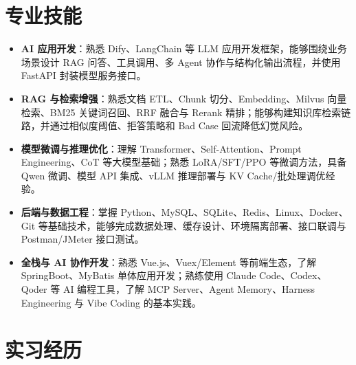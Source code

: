 \documentclass[10pt]{article}
\newlength{\iconwidth}
\begin{document}

    \section[专业技能]{\makebox[\iconwidth][c]{\color{primarycolor}{\faWrench}}\quad 专业技能}
    \begin{itemize}
        \item \textbf{AI 应用开发}：熟悉 Dify、LangChain 等 LLM 应用开发框架，能够围绕业务场景设计 RAG 问答、工具调用、多 Agent 协作与结构化输出流程，并使用 FastAPI 封装模型服务接口。
        \item \textbf{RAG 与检索增强}：熟悉文档 ETL、Chunk 切分、Embedding、Milvus 向量检索、BM25 关键词召回、RRF 融合与 Rerank 精排；能够构建知识库检索链路，并通过相似度阈值、拒答策略和 Bad Case 回流降低幻觉风险。
        \item \textbf{模型微调与推理优化}：理解 Transformer、Self-Attention、Prompt Engineering、CoT 等大模型基础；熟悉 LoRA/SFT/PPO 等微调方法，具备 Qwen 微调、模型 API 集成、vLLM 推理部署与 KV Cache/批处理调优经验。
        \item \textbf{后端与数据工程}：掌握 Python、MySQL、SQLite、Redis、Linux、Docker、Git 等基础技术，能够完成数据处理、缓存设计、环境隔离部署、接口联调与 Postman/JMeter 接口测试。
        \item \textbf{全栈与 AI 协作开发}：熟悉 Vue.js、Vuex/Element 等前端生态，了解 SpringBoot、MyBatis 单体应用开发；熟练使用 Claude Code、Codex、Qoder 等 AI 编程工具，了解 MCP Server、Agent Memory、Harness Engineering 与 Vibe Coding 的基本实践。
    \end{itemize}

    \vspace{0.45em}


    \section[实习经历]{\makebox[\iconwidth][c]{\color{primarycolor}{\faBriefcase}}\quad 实习经历}
\end{document}
